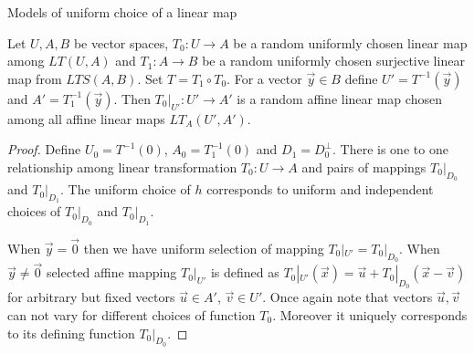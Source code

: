 \begin{section}{Models of uniform choice of a linear map}
\begin{remark}
\label{remark-model-uniform-linear-map-selection-affine}
Let $U, A, B$ be vector spaces, $T_0: U \rightarrow A$ be a random uniformly chosen linear map among $LT(U, A)$ and $T_1: A \rightarrow B$ be a random uniformly chosen surjective linear map from $LTS(A, B)$. Set $T = T_1 \circ T_0$. For a vector $\vec{y} \in B$ define $U' = T^{-1}(\vec{y})$ and $A' = T_1^{-1}(\vec{y})$. Then $T_0|_{U'}: U' \rightarrow A'$ is a random affine linear map chosen among all affine linear maps $LT_{A}(U', A')$.
\end{remark}
\begin{proof}
Define $U_0 = T^{-1}(0)$, $A_0 = T_1^{-1}(0)$ and $D_1 = D_0 ^ {\bot}$. There is one to one relationship among linear transformation $T_0: U \rightarrow A$ and pairs of mappings $T_0|_{D_0}$ and $T_0|_{D_1}$. The uniform choice of $h$ corresponds to uniform and independent choices of $T_0|_{D_0}$ and $T_0|_{D_1}$. 

When $\vec{y} = \vec{0}$ then we have uniform selection of mapping $T_0|_{U'} = T_0|_{D_0}$. When $\vec{y} \neq \vec{0}$ selected affine mapping $T_0|_{U'}$ is defined as $T_0|_{U'}(\vec{x}) = \vec{u} + T_0|_{D_0}(\vec{x} - \vec{v})$ for arbitrary but fixed vectors $\vec{u} \in A'$, $\vec{v} \in U'$. Once again note that vectors $\vec{u}, \vec{v}$ can not vary for different choices of function $T_0$. Moreover it uniquely corresponds to its defining function $T_0|_{D_0}$.
\end{proof}
\end{section}
